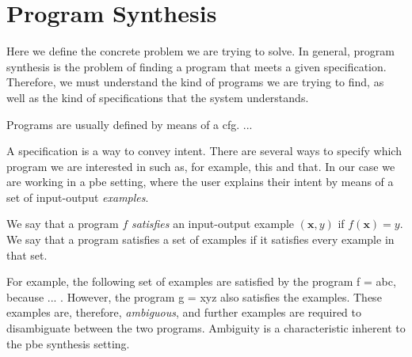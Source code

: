 \begin{definition}
\end{definition}


\section{Program Synthesis}
\label{sec:program-synthesis}

Here we define the concrete problem we are trying to solve. In general, program
synthesis is the problem of finding a program that meets a given specification.
Therefore, we must understand the kind of programs we are trying to find, as
well as the kind of specifications that the system understands.

Programs are usually defined by means of a \gls{cfg}. ...

A specification is a way to convey intent. There are several ways to specify
which program we are interested in such as, for example, this and that. In our
case we are working in a \gls{pbe} setting, where the user explains their intent
by means of a set of input-output \textit{examples}.

We say that a program $f$ \textit{satisfies} an input-output example
$(\mathbf{x}, y)$ if $f(\mathbf{x}) = y$. We say that a program satisfies a set
of examples if it satisfies every example in that set.

For example, the following set of examples are satisfied by the program f = abc,
because ... . However, the program g = xyz also satisfies the examples. These
examples are, therefore, \textit{ambiguous}, and further examples are required
to disambiguate between the two programs. Ambiguity is a characteristic inherent
to the \gls{pbe} synthesis setting.




